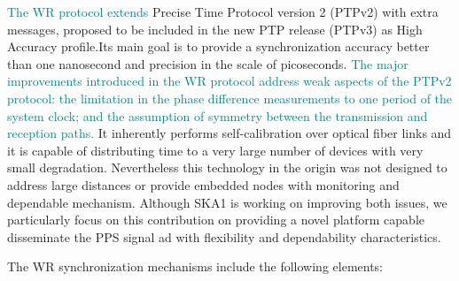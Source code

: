 \textcolor{teal}{The WR protocol}   \textcolor{teal}{extends} Precise Time Protocol version 2 (PTPv2) with extra messages, proposed to be included in the new PTP release (PTPv3) as High Accuracy profile.Its main goal is to provide a  synchronization  accuracy better than one nanosecond and  precision in the scale of picoseconds. \textcolor{teal}{The major improvements introduced in the WR protocol address weak aspects of the PTPv2 protocol: the limitation in the phase difference measurements to one period of the system clock; and the assumption of symmetry between the transmission and reception paths.} It inherently performs self-calibration over optical fiber links and it is capable of distributing time to a very large number of devices with very small degradation. Nevertheless this technology in the origin was not designed to address large distances or provide embedded nodes with monitoring and dependable mechanism. Although SKA1 is working on improving both issues, we particularly focus on this contribution on providing a novel platform capable disseminate the PPS signal ad with flexibility and dependability characteristics.  



The WR synchronization mechanisms include the following elements:

